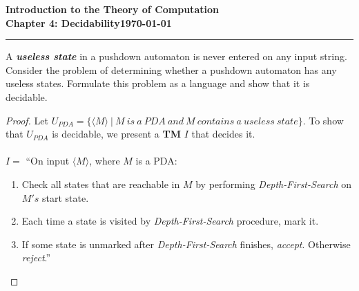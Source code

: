 \documentclass[11pt]{article}
\newcommand{\dated}{\today}
\begin{document}
\textbf{Introduction to the Theory of
Computation}\hfill\textbf{\myname}\\[0.01in]
\textbf{Chapter 4: Decidability}\hfill\textbf{\dated}\\
\smallskip\hrule\bigskip

\begin{problem}{4.24}
A \textbf{\textit{useless state}} in a pushdown automaton is never entered on any input string. Consider the problem of determining whether a pushdown automaton has any useless states. Formulate this problem as a language and show that it is decidable.
\end{problem}

\begin{proof}
Let $U_{PDA} = \{\langle M \rangle \ | \ M \ is \ a \ PDA \ and \  M \ contains \ a \ useless \ state\}$. To show that $U_{PDA}$ is decidable, we present a \textbf{TM} $I$ that decides it.  \\
\\
$I =$ \textquotedblleft On input $\langle M \rangle$, where $M$ is a PDA:
\begin{enumerate}
\item Check all states that are reachable in $M$ by performing \textit{Depth-First-Search} on $M's$ start state.
\item Each time a state is visited by \textit{Depth-First-Search} procedure, mark it.
\item If some state is unmarked after \textit{Depth-First-Search} finishes, \textit{accept}. Otherwise \textit{reject}.\textquotedblright
\end{enumerate}
\end{proof}
\end{document}
